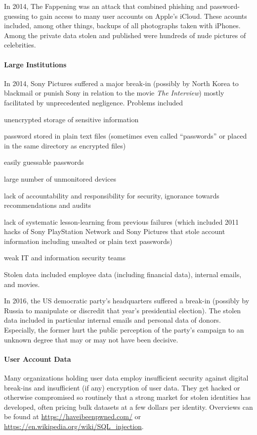 In 2014, The Fappening was an attack that combined phishing and password-guessing to gain access to many user accounts on Apple's iCloud.
These acounts included, among other things, backups of all photographs taken with iPhones.
Among the private data stolen and published were hundreds of nude pictures of celebrities.

\paragraph{Large Institutions}
In 2014, Sony Pictures suffered a major break-in (possibly by North Korea to blackmail or punish Sony in relation to the movie \emph{The Interview}) mostly facilitated by unprecedented negligence.
Problems included
\begin{compactitem}
 \item unencrypted storage of sensitive information
 \item password stored in plain text files (sometimes even called ``passwords'' or placed in the same directory as encrypted files)
 \item easily guessable passwords
 \item large number of unmonitored devices
 \item lack of accountability and responsibility for security, ignorance towards recommendations and audits
 \item lack of systematic lesson-learning from previous failures (which included 2011 hacks of Sony PlayStation Network and Sony Pictures that stole account information including unsalted or plain text passwords)
 \item weak IT and information security teams
\end{compactitem}
Stolen data included employee data (including financial data), internal emails, and movies.
\medskip

In 2016, the US democratic party's headquarters suffered a break-in (possibly by Russia to manipulate or discredit that year's presidential election).
The stolen data included in particular internal emails and personal data of donors.
Especially, the former hurt the public perception of the party's campaign to an unknown degree that may or may not have been decisive.

\paragraph{User Account Data}
Many organizations holding user data employ insufficient security against digital break-ins and insufficient (if any) encryption of user data.
They get hacked or otherwise compromised so routinely that a strong market for stolen identities has developed, often pricing bulk datasets at a few dollars per identity.
Overviews can be found at \url{https://haveibeenpwned.com/} or \url{https://en.wikipedia.org/wiki/SQL_injection}.

